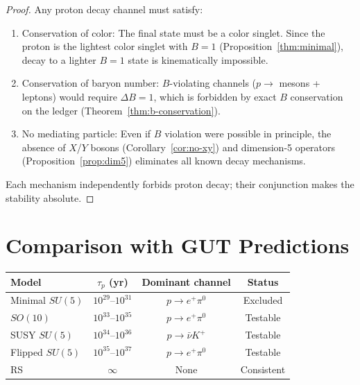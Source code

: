 \documentclass[12pt,a4paper]{article}
\theoremstyle{definition}
\theoremstyle{remark}
\begin{document}
\begin{proof}
Any proton decay channel must satisfy:
\begin{enumerate}[label=(\roman*)]
  \item Conservation of color: The final state must be a
  color singlet.  Since the proton is the lightest color
  singlet with $B = 1$ (Proposition~\ref{thm:minimal}), decay
  to a lighter $B = 1$ state is kinematically impossible.
  \item Conservation of baryon number: $B$-violating
  channels ($p \to$ mesons + leptons) would require
  $\Delta B = 1$, which is forbidden by exact $B$
  conservation on the ledger
  (Theorem~\ref{thm:b-conservation}).
  \item No mediating particle: Even if $B$ violation were
  possible in principle, the absence of $X$/$Y$ bosons
  (Corollary~\ref{cor:no-xy}) and dimension-5 operators
  (Proposition~\ref{prop:dim5}) eliminates all known decay
  mechanisms.
\end{enumerate}
Each mechanism independently forbids proton decay; their
conjunction makes the stability absolute.
\end{proof}

\section{Comparison with GUT Predictions}
\label{sec:comparison}

\begin{center}
\renewcommand{\arraystretch}{1.3}
\begin{tabular}{@{}lccc@{}}
\toprule
\textbf{Model} & \textbf{$\tau_p$ (yr)} &
\textbf{Dominant channel} & \textbf{Status} \\
\midrule
Minimal $SU(5)$ & $10^{29}$--$10^{31}$ &
$p \to e^+\pi^0$ & Excluded \\
$SO(10)$ & $10^{33}$--$10^{35}$ &
$p \to e^+\pi^0$ & Testable \\
SUSY $SU(5)$ & $10^{34}$--$10^{36}$ &
$p \to \bar{\nu} K^+$ & Testable \\
Flipped $SU(5)$ & $10^{35}$--$10^{37}$ &
$p \to e^+\pi^0$ & Testable \\
RS & $\infty$ & None & Consistent \\
\bottomrule
\end{tabular}
\end{center}
\end{document}
